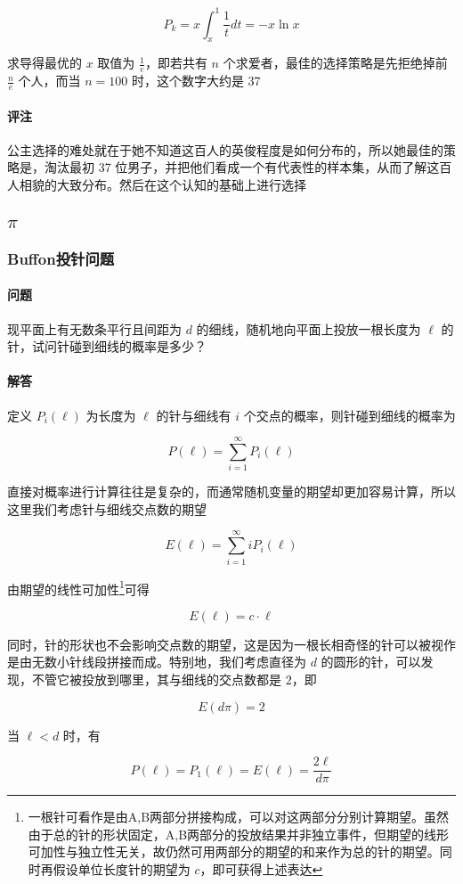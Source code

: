 \documentclass[a4paper, 11pt]{article} %
\begin{document}
$$
P_k=x\int_x^1\frac{1}{t}dt=-x\ln{x}
$$

求导得最优的 $x$ 取值为 $\frac{1}{e}$，即若共有 $n$ 个求爱者，最佳的选择策略是先拒绝掉前 $\frac{n}{e}$ 个人，而当 $n=100$ 时，这个数字大约是 $37$

\paragraph{评注}

公主选择的难处就在于她不知道这百人的英俊程度是如何分布的，所以她最佳的策略是，淘汰最初 37 位男子，并把他们看成一个有代表性的样本集，从而了解这百人相貌的大致分布。然后在这个认知的基础上进行选择

\subsection{$\pi$}

\subsubsection{Buffon投针问题}

\paragraph{问题}

现平面上有无数条平行且间距为 $d$ 的细线，随机地向平面上投放一根长度为 $\ell$ 的针，试问针碰到细线的概率是多少？



\paragraph{解答}

定义 $P_i(\ell)$ 为长度为 $\ell$ 的针与细线有 $i$ 个交点的概率，则针碰到细线的概率为 

$$
P(\ell)=\sum\limits_{i=1}^\infty P_i(\ell)
$$

直接对概率进行计算往往是复杂的，而通常随机变量的期望却更加容易计算，所以这里我们考虑针与细线交点数的期望 

$$
E(\ell)=\sum\limits_{i=1}^\infty iP_i(\ell)
$$

由期望的线性可加性\footnote{一根针可看作是由A,B两部分拼接构成，可以对这两部分分别计算期望。虽然由于总的针的形状固定，A,B两部分的投放结果并非独立事件，但期望的线形可加性与独立性无关，故仍然可用两部分的期望的和来作为总的针的期望。同时再假设单位长度针的期望为 $c$，即可获得上述表达}可得

$$
E(\ell)=c\cdot\ell
$$

同时，针的形状也不会影响交点数的期望，这是因为一根长相奇怪的针可以被视作是由无数小针线段拼接而成。特别地，我们考虑直径为 $d$ 的圆形的针，可以发现，不管它被投放到哪里，其与细线的交点数都是 $2$，即

$$
E(d\pi)=2
$$

当 $\ell<d$ 时，有 

$$
P(\ell)=P_1(\ell)=E(\ell)=\frac{2\ell}{d\pi}
$$
\end{document}
